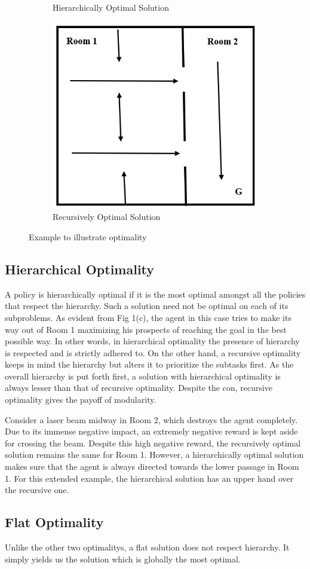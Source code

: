\begin{figure}[ht]
\begin{subfigure}[b]{0.5\linewidth}
    \caption{Hierarchically Optimal Solution} 
    \vspace{4ex}
  \end{subfigure}%
  \begin{subfigure}[b]{0.5\linewidth}
    \centering
    \includegraphics[width=.5\linewidth]{images/img4.JPG} 
    \caption{Recursively Optimal Solution} 
    \vspace{4ex}
  \end{subfigure} 
    \caption{Example to illustrate optimality}

\end{figure}

\subsection*{Hierarchical Optimality}

A policy is hierarchically optimal if it is the most optimal amongst all the policies that respect the hierarchy. Such a solution need not be optimal on each of its subproblems. As evident from Fig 1(c), the agent in this case tries to make its way out of Room 1 maximizing his prospects of reaching the goal in the best possible way. In other words, in hierarchical optimality the presence of hierarchy is respected and is strictly adhered to. On the other hand, a recursive optimality keeps in mind the hierarchy but alters it to prioritize the subtasks first. As the overall hierarchy is put forth first, a solution with hierarchical optimality is always lesser than that of recursive optimality. Despite the con, recursive optimality gives the payoff of modularity. 

Consider a laser beam midway in Room 2, which destroys the agent completely. Due to its immense negative impact, an extremely negative reward is kept aside for crossing the beam. Despite this high negative reward, the recursively optimal solution remains the same for Room 1. However, a hierarchically optimal solution makes sure that the agent is always directed towards the lower passage in Room 1. For this extended example, the hierarchical solution has an upper hand over the recursive one. 


\subsection*{Flat Optimality}

Unlike the other two optimalitys, a flat solution does not respect hierarchy. It simply yields us the solution which is globally the most optimal. 
